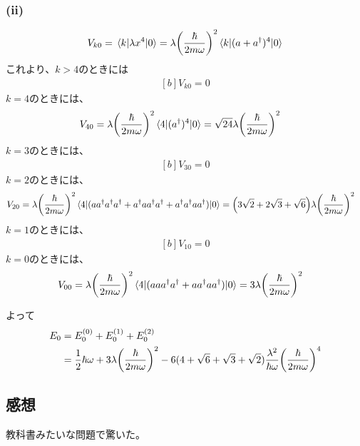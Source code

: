 \documentclass[../../sp_2018.tex]{subfiles}
\begin{document}
\subsubsection*{(ii)}
\begin{equation}\begin{aligned}[b]
    V_{k0}=\mel{k}{\lambda x^4}{0} = \lambda\qty(\frac{\hbar}{2m\omega})^2\mel{k}{(a+a^\dagger)^4}{0}
\end{aligned}\end{equation}
これより、\(k>4\)のときには
\begin{equation}\begin{aligned}[b]
    V_{k0} = 0
\end{aligned}\end{equation}
\(k=4\)のときには、
\begin{equation}\begin{aligned}[b]
    V_{40}&=\lambda\qty(\frac{\hbar}{2m\omega})^2\mel{4}{(a^\dagger)^4}{0}=\sqrt{24}\lambda\qty(\frac{\hbar}{2m\omega})^2
\end{aligned}\end{equation}
\(k=3\)のときには、
\begin{equation}\begin{aligned}[b]
    V_{30}=0
\end{aligned}\end{equation}
\(k=2\)のときには、
\begin{equation}\begin{aligned}[b]
    V_{20}
    &=\lambda\qty(\frac{\hbar}{2m\omega})^2\mel{4}{(aa^\dagger a^\dagger a^\dagger+a^\dagger a a^\dagger a^\dagger+ a^\dagger a^\dagger a a^\dagger)}{0}
    =\qty(3\sqrt{2}+2\sqrt{3}+\sqrt{6})\lambda\qty(\frac{\hbar}{2m\omega})^2
\end{aligned}\end{equation}
\(k=1\)のときには、
\begin{equation}\begin{aligned}[b]
    V_{10}=0
\end{aligned}\end{equation}
\(k=0\)のときには、
\begin{equation}\begin{aligned}[b]
    V_{00}
    &=\lambda\qty(\frac{\hbar}{2m\omega})^2\mel{4}{(aaa^\dagger a^\dagger+aa^\dagger aa^\dagger)}{0}
    =3\lambda\qty(\frac{\hbar}{2m\omega})^2
\end{aligned}\end{equation}

よって
\begin{equation}\begin{aligned}[b]
    E_0 &= E_0^{(0)}+E_0^{(1)}+E_0^{(2)}\\
    &= \frac{1}{2}\hbar\omega + 3\lambda\qty(\frac{\hbar}{2m\omega})^2
        -6(4+\sqrt{6}+\sqrt{3}+\sqrt{2})\frac{\lambda^2}{\hbar\omega}\qty(\frac{\hbar}{2m\omega})^4
\end{aligned}\end{equation}


\subsection*{感想}
教科書みたいな問題で驚いた。
\end{document}
